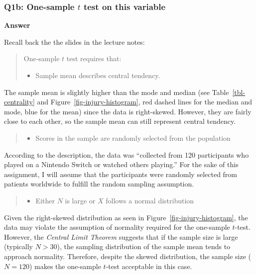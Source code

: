 \documentclass[
  a4paper,
  DIV=11,
  numbers=noendperiod]{scrartcl}
\providecommand{\tightlist}{%
  \setlength{\itemsep}{0pt}\setlength{\parskip}{0pt}}\usepackage{longtable,booktabs,array}
\begin{document}
\subsubsection{\texorpdfstring{Q1b: One-sample \(𝑡\) test on this
variable}{Q1b: One-sample 𝑡 test on this variable}}\label{q1b-one-sample-ux1d461-test-on-this-variable}

\textbf{Answer}

Recall back the the slides in the lecture notes:

\begin{quote}
One‐sample \(t\) test requires that:

\begin{itemize}
\tightlist
\item
  Sample mean describes central tendency.
\end{itemize}
\end{quote}

The sample mean is slightly higher than the mode and median (see
Table~\ref{tbl-centrality} and Figure~\ref{fig-injury-histogram}, red
dashed lines for the median and mode, blue for the mean) since the data
is right-skewed. However, they are fairly close to each other, so the
sample mean can still represent central tendency.

\begin{quote}
\begin{itemize}
\tightlist
\item
  Scores in the sample are randomly selected from the population
\end{itemize}
\end{quote}

According to the description, the data was ``collected from 120
participants who played on a Nintendo Switch or watched others
playing.'' For the sake of this assignment, I will assume that the
participants were randomly selected from patients worldwide to fulfill
the random sampling assumption.

\begin{quote}
\begin{itemize}
\tightlist
\item
  Either \(N\) is large or \(X\) follows a normal distribution
\end{itemize}
\end{quote}

Given the right-skewed distribution as seen in
Figure~\ref{fig-injury-histogram}, the data may violate the assumption
of normality required for the one-sample \(t\)-test. However, the
\emph{Central Limit Theorem} suggests that if the sample size is large
(typically \(N > 30\)), the sampling distribution of the sample mean
tends to approach normality. Therefore, despite the skewed distribution,
the sample size (\(N = 120\)) makes the one-sample \(t\)-test acceptable
in this case.
\end{document}

